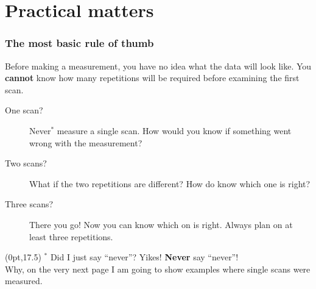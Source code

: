 \documentclass[10pt, xcolor=x11names, compress]{beamer}
\begin{document}
\section{Practical matters}

\begin{frame}
  \frametitle{The most basic rule of thumb}
  Before making a measurement, you have no idea what the data will
  look like.  You \textbf{cannot} know how many repetitions will be
  required before examining the first scan.
  \begin{description}
  \item[One scan?] Never$^*$ measure a single scan.  How would you
    know if something went wrong with the measurement?
  \item[Two scans?] What if the two repetitions are different?  How do
    know which one is right?
  \item[Three scans?] There you go!  Now you can know which on is
    right.  \alert{Always plan on at least three repetitions.}
  \end{description}
  \begin{textblock*}{0.7\linewidth}(0pt,17.5\TPVertModule)%
    \footnotesize%
    $^*$ Did I just say ``never''?  Yikes!  \textbf{Never} say
    ``never''!\\Why, on the very next page I am going to show examples
    where single scans were measured.
  \end{textblock*}
\end{frame}
\end{document}
